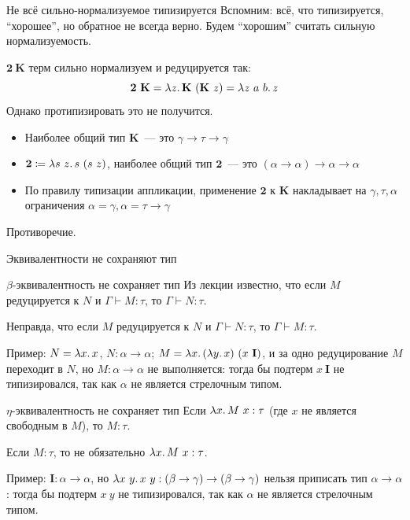     \begin{frame}{Не всё сильно-нормализуемое типизируется \advancedslide}
        Вспомним: всё, что типизируется, ``хорошее'', но обратное не всегда верно. Будем ``хорошим'' считать сильную нормализуемость.

        \vspace{1em}
        $\mathbf{2}~\mathbf{K}$ терм сильно нормализуем и редуцируется так:
        \[\mathbf{2}~\mathbf{K} = \lambda z\ldotp \mathbf{K}~(\mathbf{K}~z) = \lambda z~a~b\ldotp z\]
        Однако протипизировать это не получится.
        \begin{itemize}
            \item Наиболее общий тип $\mathbf{K}$~--- это $\gamma \to \tau \to \gamma$
            \item $\mathbf{2} \coloneqq \lambda s~z\ldotp s~(s~z)$, наиболее общий тип $\mathbf{2}$~--- это $(\alpha \to \alpha) \to \alpha \to \alpha$
            \item По правилу типизации аппликации, применение $\mathbf{2}$ к $\mathbf{K}$ накладывает на $\gamma, \tau, \alpha$ ограничения $\alpha = \gamma, \alpha = \tau \to \gamma$
        \end{itemize}
        Противоречие.
    \end{frame}

    \begin{frame}{Эквивалентности не сохраняют тип \advancedslide}
        \begin{block}{$\beta$-эквивалентность не сохраняет тип}
            Из лекции известно, что если $M$ редуцируется к $N$ и $\Gamma \vdash M: \tau$,
            то $\Gamma \vdash N: \tau$.

            Неправда, что если $M$ редуцируется к $N$ и $\Gamma \vdash N: \tau$, то
            $\Gamma \vdash M: \tau$.

            Пример: $N = \lambda x\ldotp x$, $N: \alpha \to
            \alpha$; $M = \lambda x\ldotp (\lambda y\ldotp x)~(x~\mathbf{I})$, и
            за одно редуцирование $M$ переходит в $N$, но $M: \alpha \to \alpha$ не
            выполняется: тогда бы подтерм $x~\mathbf{I}$ не типизировался, так как $\alpha$
            не является стрелочным типом.
        \end{block}
        \begin{block}{$\eta$-эквивалентность не сохраняет тип}
            Если $\lambda x\ldotp M~x: \tau$ (где $x$ не является свободным в $M$), то
            $M: \tau$.

            Если $M: \tau$, то не обязательно $\lambda x \ldotp M~x: \tau$.

            Пример:
            $\mathbf{I}: \alpha \to \alpha$, но $\lambda x~y\ldotp x~y: (\beta \to \gamma) \to
            (\beta \to \gamma)$ нельзя приписать тип $\alpha \to \alpha$: тогда бы подтерм
            $x~y$ не типизировался, так как $\alpha$ не является стрелочным типом.
        \end{block}
    \end{frame}

